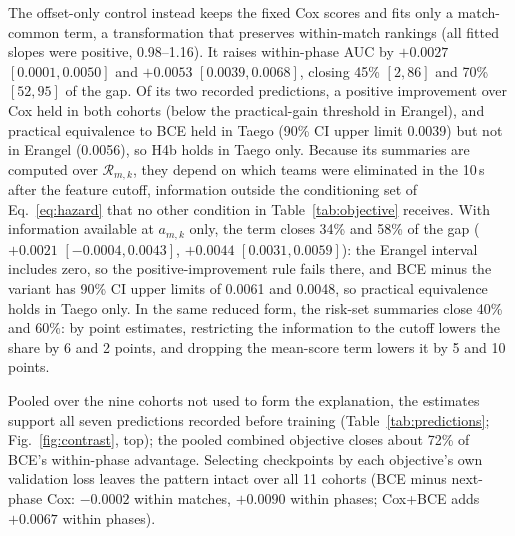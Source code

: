 \documentclass[sigconf,anonymous]{acmart}
\begin{document}
The offset-only control instead keeps the fixed Cox scores and fits only a match-common term, a transformation that preserves within-match rankings (all fitted slopes were positive, 0.98--1.16). It raises within-phase AUC by $+0.0027$ $[0.0001,\allowbreak 0.0050]$ and $+0.0053$ $[0.0039,\allowbreak 0.0068]$, closing 45\% $[2,\allowbreak 86]$ and 70\% $[52,\allowbreak 95]$ of the gap. Of its two recorded predictions, a positive improvement over Cox held in both cohorts (below the practical-gain threshold in Erangel), and practical equivalence to BCE held in Taego (90\% CI upper limit 0.0039) but not in Erangel (0.0056), so H4b holds in Taego only. Because its summaries are computed over $\mathcal{R}_{m,k}$, they depend on which teams were eliminated in the 10\,s after the feature cutoff, information outside the conditioning set of Eq.~\eqref{eq:hazard} that no other condition in Table~\ref{tab:objective} receives. With information available at $a_{m,k}$ only, the term closes 34\% and 58\% of the gap ($+0.0021$ $[-0.0004,\allowbreak 0.0043]$, $+0.0044$ $[0.0031,\allowbreak 0.0059]$): the Erangel interval includes zero, so the positive-improvement rule fails there, and BCE minus the variant has 90\% CI upper limits of 0.0061 and 0.0048, so practical equivalence holds in Taego only. In the same reduced form, the risk-set summaries close 40\% and 60\%: by point estimates, restricting the information to the cutoff lowers the share by 6 and 2 points, and dropping the mean-score term lowers it by 5 and 10 points.


Pooled over the nine cohorts not used to form the explanation, the estimates support all seven predictions recorded before training (Table~\ref{tab:predictions}; Fig.~\ref{fig:contrast}, top); the pooled combined objective closes about 72\% of BCE's within-phase advantage. Selecting checkpoints by each objective's own validation loss leaves the pattern intact over all 11 cohorts (BCE minus next-phase Cox: $-0.0002$ within matches, $+0.0090$ within phases; Cox+BCE adds $+0.0067$ within phases).
\end{document}
